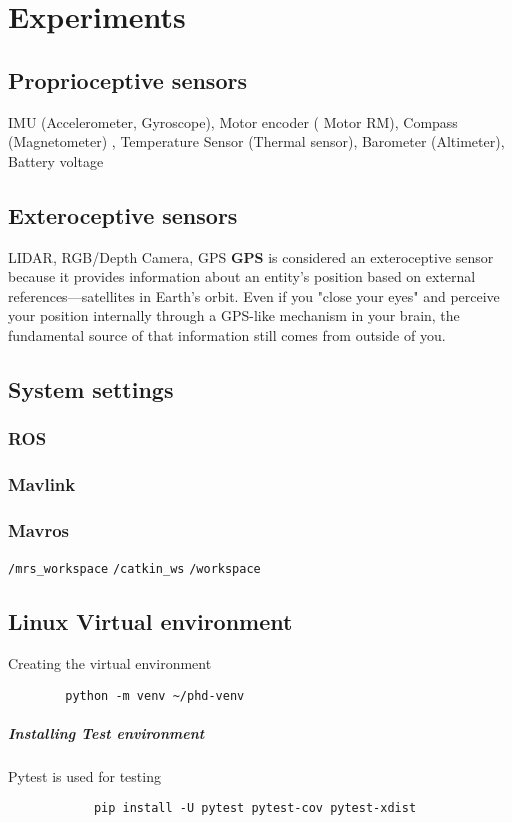 \chapter{Experiments}



\section{Proprioceptive sensors} IMU (Accelerometer, Gyroscope), Motor encoder (	Motor RM), Compass (Magnetometer) , Temperature Sensor (Thermal sensor), Barometer (Altimeter), Battery voltage

\section{Exteroceptive sensors} LIDAR, RGB/Depth Camera, GPS
    \textbf{GPS} is considered an exteroceptive sensor because it provides information about an entity’s position based on external references—satellites in Earth's orbit. Even if you "close your eyes" and perceive your position internally through a GPS-like mechanism in your brain, the fundamental source of that information still comes from outside of you.


\section{System settings}
    \subsection{ROS}
    \subsection{Mavlink}
    \subsection{Mavros}
        \texttt{/mrs\_workspace}
        \texttt{/catkin\_ws}
        \texttt{/workspace}

\section{Linux Virtual environment}
    Creating the virtual environment
    \begin{verbatim}
        python -m venv ~/phd-venv
    \end{verbatim}
    \paragraph{Installing Test environment}
        Pytest is used for testing
        \begin{verbatim}
            pip install -U pytest pytest-cov pytest-xdist
        \end{verbatim}

